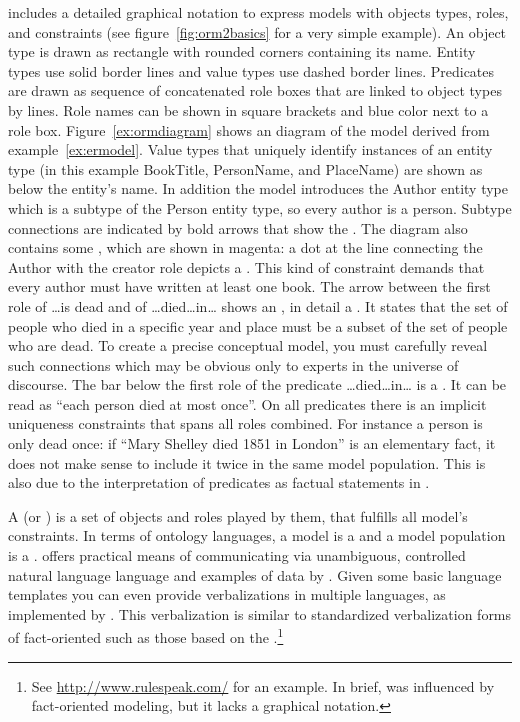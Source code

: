  includes a detailed graphical notation to express models with
objects types, roles, and constraints (see figure~\ref{fig:orm2basics} for a
very simple example).  An object type is drawn as rectangle with rounded
corners containing its name.  Entity types use solid border lines and value
types use dashed border lines.  Predicates are drawn as sequence of
concatenated role boxes that are linked to object types by lines.  Role names
can be shown in square brackets and blue color next to a role box.
Figure~\ref{ex:ormdiagram} shows an  diagram of the model derived
from example~\ref{ex:ermodel}. Value types that uniquely identify instances of
an entity type (in this example {\ormtext BookTitle}, {\ormtext PersonName},
and {\ormtext PlaceName}) are shown as  below the entity's
name. In addition the model introduces the {\ormtext Author} entity type which
is a subtype of the {\ormtext Person} entity type, so every author is a person.
Subtype connections are indicated by bold arrows that show the
. The diagram also contains some , which are shown in magenta: a dot at the line connecting
the {\ormtext Author} with the {\ormtext creator} role depicts a
. This kind of constraint demands that every
author must have written at least one book.  The arrow between the first role
of {\ormtext \ldots is dead} and of {\ormtext\ldots died\ldots in\ldots} shows
an , in detail a . It states
that the set of people who died in a specific year and place must be a subset of
the set of people who are dead. To create a precise conceptual model, you must
carefully reveal such connections which may be obvious only to experts in the
universe of discourse.  The bar below the first role of the predicate
{\ormtext\ldots died\ldots in\ldots} is a . It can
be read as ``each person died at most once''. On all predicates there is an
implicit uniqueness constraints that spans all roles combined.  For instance a
person is only dead once: if ``Mary Shelley died 1851 in London'' is an
elementary fact, it does not make sense to include it twice in the same model
population. This is also due to the interpretation of  predicates as
factual statements in .

A  (or ) is a set of objects and
roles played by them, that fulfills all model's constraints. In terms of
ontology languages, a model is a  and a model population is a
.   offers practical means of communicating via
unambiguous, controlled natural language language and examples of data by
 \cite{Halpin2004}. Given some basic language templates you
can even provide verbalizations in multiple languages, as implemented by
\cite{Jarrar2006}. This verbalization is similar to standardized verbalization
forms of fact-oriented  such as those based on the
.\footnote{See
\url{http://www.rulespeak.com/} for an example. In brief,  was
influenced by fact-oriented modeling, but it lacks a graphical notation.}

